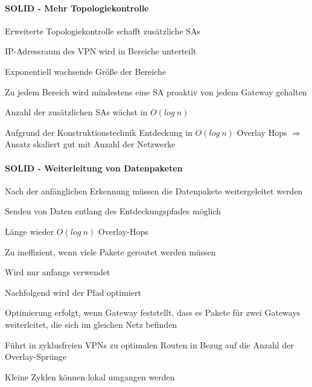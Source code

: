 \documentclass[a4paper]{article}
\begin{document}
\begin{multicols}{3}
      \paragraph{SOLID - Mehr Topologiekontrolle}
      \begin{itemize*}
            \item Erweiterte Topologiekontrolle schafft zusätzliche SAs
            \item IP-Adressraum des VPN wird in Bereiche unterteilt
            \begin{itemize*}
                  \item Exponentiell wachsende Größe der Bereiche
            \end{itemize*}
            \item Zu jedem Bereich wird mindestens eine SA proaktiv von jedem Gateway gehalten
            \item Anzahl der zusätzlichen SAs wächst in $O(log\ n)$
            \item Aufgrund der Konstruktionstechnik Entdeckung in $O(log\ n)$ Overlay Hops $\Rightarrow$ Ansatz skaliert gut mit Anzahl der Netzwerke
      \end{itemize*}

      \paragraph{SOLID - Weiterleitung von Datenpaketen}
      \begin{itemize*}
            \item Nach der anfänglichen Erkennung müssen die Datenpakete weitergeleitet werden
            \item Senden von Daten entlang des Entdeckungspfades möglich
            \begin{itemize*}
                  \item Länge wieder $O(log\ n)$ Overlay-Hops
                  \item Zu ineffizient, wenn viele Pakete geroutet werden müssen
                  \item Wird nur anfangs verwendet
            \end{itemize*}
            \item Nachfolgend wird der Pfad optimiert
            \begin{itemize*}
                  \item Optimierung erfolgt, wenn Gateway feststellt, dass es Pakete für zwei Gateways weiterleitet, die sich im gleichen Netz befinden
                  \item Führt in zyklusfreien VPNs zu optimalen Routen in Bezug auf die Anzahl der Overlay-Sprünge
                  \item Kleine Zyklen können lokal umgangen werden
            \end{itemize*}
      \end{itemize*}


\end{multicols}
\end{document}
